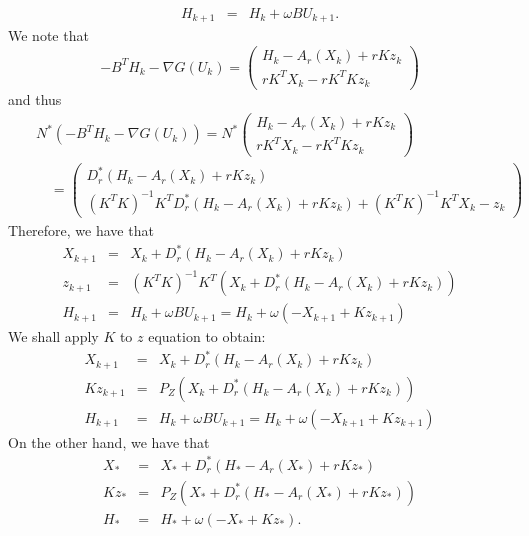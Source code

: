 \begin{itemize}
\begin{eqnarray}
H_{k+1} &=& H_k + \omega B U_{k+1}. 
\end{eqnarray}
We note that 
\begin{equation}
-B^TH_k - \nabla G(U_k) = \begin{pmatrix} H_k - A_r(X_k) + rK z_k \\ rK^T X_k - r K^T K z_k \end{pmatrix} 
\end{equation}
and thus 
\begin{eqnarray*}
&& N^{*}(-B^TH_k - \nabla G(U_k)) = N^{*} \begin{pmatrix} H_k - A_r(X_k) + rK z_k \\ rK^T X_k - r K^T K z_k \end{pmatrix} \\
&& \quad = 
\begin{pmatrix} D_r^{*} (H_k - A_r(X_k) + rK z_k) \\ (K^TK)^{-1} K^T D_r^{*} (H_k - A_r(X_k) + rK z_k) + (K^T K)^{-1}K^T X_k - z_k \end{pmatrix}
\end{eqnarray*}
Therefore, we have that 
\begin{eqnarray*}
X_{k+1} &=& X_k + D_r^{*} (H_k - A_r(X_k) + r K z_k) \\
z_{k+1} &=& (K^TK)^{-1} K^T (X_{k} + D_r^{*} (H_k - A_r(X_k) + r K z_k)) \\ 
H_{k+1} &=& H_k + \omega B U_{k+1} = H_k + \omega (-X_{k+1} + Kz_{k+1} )
\end{eqnarray*}
We shall apply $K$ to $z$ equation to obtain: 
\begin{eqnarray*}
X_{k+1} &=& X_k + D_r^{*} (H_k - A_r(X_k) + r K z_k) \\
Kz_{k+1} &=& P_Z (X_{k} + D_r^{*} (H_k - A_r(X_k) + r K z_k)) \\ 
H_{k+1} &=& H_k + \omega B U_{k+1} = H_k + \omega (-X_{k+1} + Kz_{k+1} )
\end{eqnarray*}
On the other hand, we have that 
\begin{eqnarray*}
X_{*} &=& X_* + D_r^{*} (H_* - A_r(X_*) + r K z_*) \\
Kz_{*} &=& P_Z (X_* + D_r^{*} (H_* - A_r(X_*) + rK z_*)) \\ 
H_{*} &=& H_* + \omega (-X_{*} + K z_{*}). 

\end{eqnarray*}
\end{itemize}
